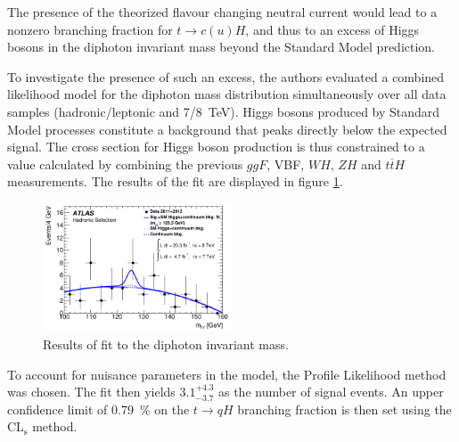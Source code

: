 The presence of the theorized flavour changing neutral current would lead to a nonzero branching fraction for $t\to c(u) H$, and thus to an excess of Higgs bosons in the diphoton invariant mass beyond the Standard Model prediction.

To investigate the presence of such an excess, the authors evaluated a combined likelihood model for the diphoton mass distribution simultaneously over all data samples (hadronic/leptonic and \num{7}/\SI{8}{TeV}).
Higgs bosons produced by Standard Model processes constitute a background that peaks directly below the expected signal.
The cross section for Higgs boson production is thus constrained to a value calculated by combining the previous $ggF$, VBF, $WH$, $ZH$ and $t\overline{t}H$ measurements.
The results of the fit are displayed in figure \ref{mgammagamma}.

\begin{figure}
  \includegraphics[width=0.5\textwidth]{figures/mgammagamma.pdf}
  \caption{Results of fit to the diphoton invariant mass.\cite{aad}}
  \label{mgammagamma}
\end{figure}

To account for nuisance parameters in the model, the Profile Likelihood method was chosen.
The fit then yields $3.1^{+4.3}_{-3.7}$ as the number of signal events.
An upper confidence limit of \SI{0.79}{\percent} on the $t\to q H$ branching fraction is then set using the $\text{CL}_\text{s}$ method.


